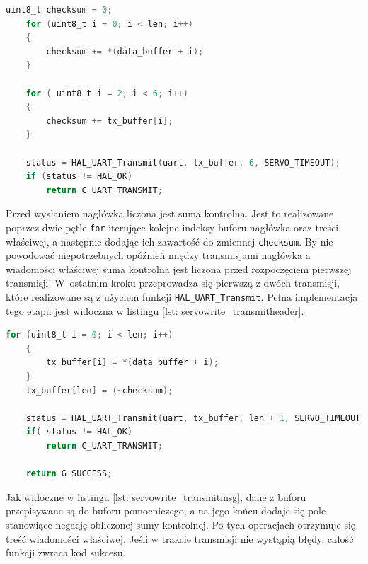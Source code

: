 \begin{lstlisting}[language=C,
caption={Fragment \texttt{ServoWrite} odpowiadający za transmisję nagłówka},
label={lst: servowrite_transmitheader}]
    uint8_t checksum = 0;
    for (uint8_t i = 0; i < len; i++)
    {
        checksum += *(data_buffer + i);
    }
    
    for ( uint8_t i = 2; i < 6; i++)
    {
        checksum += tx_buffer[i];
    }
    
    status = HAL_UART_Transmit(uart, tx_buffer, 6, SERVO_TIMEOUT);
    if (status != HAL_OK)
        return C_UART_TRANSMIT;
\end{lstlisting}
 Przed wysłaniem nagłówka liczona jest suma kontrolna. Jest to realizowane poprzez dwie pętle \texttt{for} iterujące kolejne indeksy buforu nagłówka oraz treści właściwej, a następnie dodając ich zawartość do zmiennej \texttt{checksum}. By nie powodować niepotrzebnych opóźnień między transmisjami nagłówka a wiadomości właściwej suma kontrolna jest liczona przed rozpoczęciem pierwszej transmisji. W~ostatnim kroku przeprowadza się pierwszą z dwóch transmisji, które realizowane są z użyciem funkcji \texttt{HAL\_UART\_Transmit}. Pełna implementacja tego etapu jest widoczna w listingu \ref{lst: servowrite_transmitheader}.

\begin{lstlisting}[language=C,
    caption={Fragment \texttt{ServoWrite} odpowiadający za transmisję wiadomości właściwej},
    label={lst: servowrite_transmitmsg}]
    for (uint8_t i = 0; i < len; i++)
    {
        tx_buffer[i] = *(data_buffer + i);
    }
    tx_buffer[len] = (~checksum);
    
    status = HAL_UART_Transmit(uart, tx_buffer, len + 1, SERVO_TIMEOUT);
    if( status != HAL_OK)
        return C_UART_TRANSMIT;
    
    return G_SUCCESS;
\end{lstlisting}
Jak widoczne w listingu \ref{lst: servowrite_transmitmsg}, dane z buforu przepisywane są do buforu pomocniczego, a na jego końcu dodaje się pole stanowiące negację obliczonej sumy kontrolnej. Po tych operacjach otrzymuje się treść wiadomości właściwej. Jeśli w trakcie transmisji nie wystąpią błędy, całość funkcji zwraca kod sukcesu.

